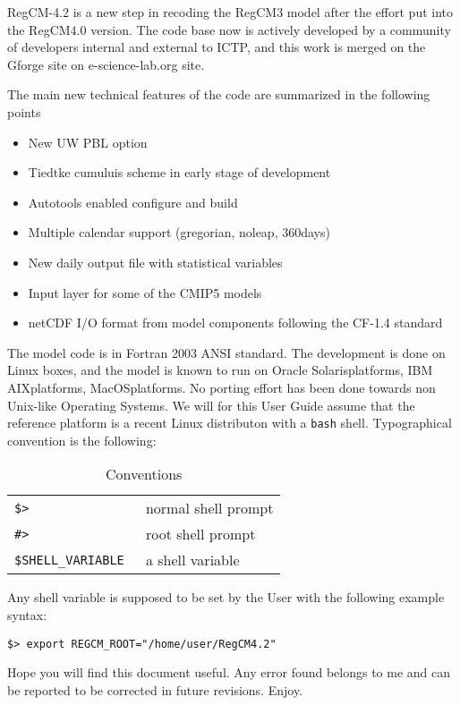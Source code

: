 %
%

RegCM-4.2 is a new step in recoding the RegCM3 model after the effort put into
the RegCM4.0 version. The code base now is actively developed by a community
of developers internal and external to ICTP, and this work is merged on the
Gforge site on e-science-lab.org site.

The main new technical features of the code are summarized in the following
points

\begin{itemize}
\item New UW PBL option
\item Tiedtke cumuluis scheme in early stage of development
\item Autotools enabled configure and build
\item Multiple calendar support (gregorian, noleap, 360days)
\item New daily output file with statistical variables
\item Input layer for some of the CMIP5 models
\item netCDF I/O format from model components following the CF-1.4 standard
\end{itemize}

The model code is in Fortran 2003 ANSI standard.
The development is done on Linux boxes, and the model is known to run
on Oracle Solaris\texttrademark platforms, IBM AIX\texttrademark platforms,
MacOS\texttrademark platforms.
No porting effort has been done towards non Unix-like Operating Systems.
We will for this User Guide assume that the reference platform is a recent
Linux distributon with a \verb=bash= shell.
Typographical convention is the following:

\begin{table}[ht]
\caption{Conventions}
\vspace{0.05 in}
\centering
\begin{tabular}{l|l}
\hline
\verb=$> = & normal shell prompt \\
\verb=#> = & root shell prompt \\
\verb=$SHELL_VARIABLE = & a shell variable \\
\hline
\end{tabular}
\label{conventions}
\end{table}

Any shell variable is supposed to be set by the User with the following example
syntax:

\begin{Verbatim}
$> export REGCM_ROOT="/home/user/RegCM4.2"
\end{Verbatim}

Hope you will find this document useful. Any error found belongs to me and can
be reported to be corrected in future revisions. Enjoy.
